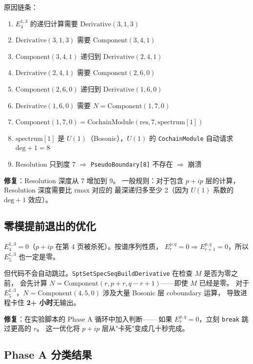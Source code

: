 \documentclass[a4paper,fontset=ubuntu,12pt]{ctexart}
\begin{document}
原因链条：
\begin{enumerate}
\item $E^{1,3}_4$ 的递归计算需要 $\text{Derivative}(3,1,3)$
\item $\text{Derivative}(3,1,3)$ 需要 $\text{Component}(3,4,1)$
\item $\text{Component}(3,4,1)$ 递归到 $\text{Derivative}(2,4,1)$
\item $\text{Derivative}(2,4,1)$ 需要 $\text{Component}(2,6,0)$
\item $\text{Component}(2,6,0)$ 递归到 $\text{Derivative}(1,6,0)$
\item $\text{Derivative}(1,6,0)$ 需要 $N = \text{Component}(1,7,0)$
\item $\text{Component}(1,7,0) = \text{CochainModule}(\text{res}, 7, \text{spectrum}[1])$
\item $\text{spectrum}[1]$ 是 $U(1)$（Bosonic），$U(1)$ 的 \texttt{CochainModule} 自动请求
      $\text{deg}+1 = 8$
\item Resolution 只到度 7 $\Rightarrow$ \texttt{PseudoBoundary[8]} 不存在 $\Rightarrow$ 崩溃
\end{enumerate}

\textbf{修复}：Resolution 深度从 7 增加到 9。
一般规则：对于包含 $p{+}ip$ 层的计算，Resolution 深度需要比 $\text{rmax}$ 对应的
最深递归多至少 2（因为 $U(1)$ 系数的 $\text{deg}+1$ 效应）。

\subsection{零模提前退出的优化}

$E^{1,3}_4 = 0$（$p{+}ip$ 在第 4 页被杀死）。按谱序列性质，
$E^{p,q}_{r} = 0 \Rightarrow E^{p,q}_{r+1} = 0$，所以 $E^{1,3}_5$ 也一定是零。

但代码不会自动跳过。\texttt{SptSetSpecSeqBuildDerivative} 在检查 $M$ 是否为零之前，
会先计算 $N = \text{Component}(r, p{+}r, q{-}r{+}1)$——即使 $M$ 已经是零。
对于 $E^{1,3}_5$，$N = \text{Component}(4, 5, 0)$ 涉及大量 Bosonic 层 coboundary 运算，
导致进程卡住 \textbf{2+ 小时}无输出。

\textbf{修复}：在实验脚本的 Phase A 循环中加入判断——
如果 $E^{p,q}_r = 0$，立刻 \texttt{break} 跳过更高的 $r$。
这一优化将 $p{+}ip$ 层从"卡死"变成几十秒完成。

\subsection{Phase A 分类结果}
\end{document}

